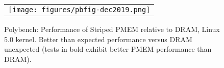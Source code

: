 \begin{figure}[!hb]
    \captionsetup{justification=centering}
    \centering
    \caption{Polybench: Performance of Striped PMEM relative to DRAM, Linux 5.0 kernel.  Better than expected performance versus DRAM unexpected (tests in bold exhibit better PMEM performance than DRAM).}
    \vspace{0.1cm}
    \label{fig:polybench}
    \begin{tabular}{c}
        \texttt{[image: figures/pbfig-dec2019.png]}
    \end{tabular}
\end{figure}
